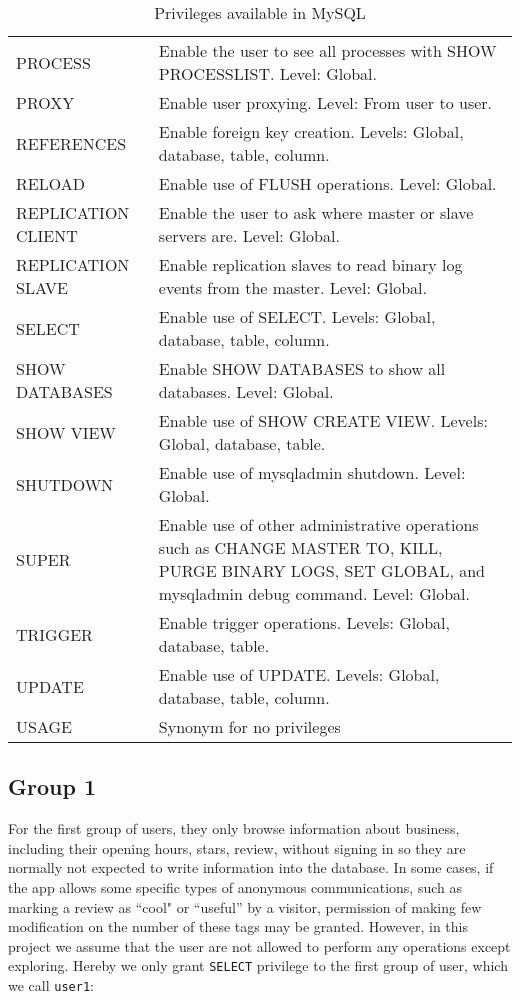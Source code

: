 \documentclass[12pt]{scrbook}
\begin{document}
\begin{table}
\begin{tabular}{l|p{5.5in}}
      PROCESS & Enable the user to see all processes with SHOW PROCESSLIST. Level: Global. \\
      PROXY & Enable user proxying. Level: From user to user. \\
      REFERENCES & Enable foreign key creation. Levels: Global, database, table, column. \\
      RELOAD & Enable use of FLUSH operations. Level: Global. \\
      REPLICATION CLIENT & Enable the user to ask where master or slave servers are. Level: Global. \\
      REPLICATION SLAVE & Enable replication slaves to read binary log events from the master. Level: Global. \\
      SELECT & Enable use of SELECT. Levels: Global, database, table, column. \\
      SHOW DATABASES & Enable SHOW DATABASES to show all databases. Level: Global. \\
      SHOW VIEW & Enable use of SHOW CREATE VIEW. Levels: Global, database, table. \\
      SHUTDOWN & Enable use of mysqladmin shutdown. Level: Global. \\
      SUPER & Enable use of other administrative operations such as CHANGE MASTER TO, KILL, PURGE BINARY LOGS, SET GLOBAL, and mysqladmin debug command. Level: Global. \\
      TRIGGER & Enable trigger operations. Levels: Global, database, table. \\
      UPDATE & Enable use of UPDATE. Levels: Global, database, table, column. \\
      USAGE & Synonym for  no privileges  \\
      \hline
      \end{tabular}%
    \caption{Privileges available in MySQL}
    \label{tab:privileges}%
  \end{table}%

\subsection{Group 1}
    For the first group of users, they only browse information about business, including their opening hours, stars, review, without signing in so they are normally not expected to write information into the database. In some cases, if the app allows some specific types of anonymous communications, such as marking a review as ``cool" or ``useful'' by a visitor, permission of making few modification on the number of these tags may be granted. However, in this project we assume that the user are not allowed to perform any operations except exploring. Hereby we only grant \texttt{SELECT} privilege to the first group of user, which we call \texttt{user1}:
\end{document}
